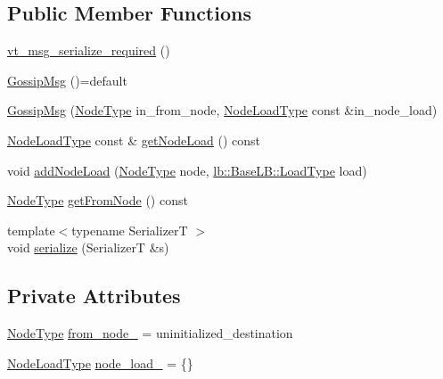 \subsection*{Public Member Functions}
\begin{DoxyCompactItemize}
\item 
\hyperlink{structvt_1_1vrt_1_1collection_1_1balance_1_1_gossip_msg_adf3c2f55e4349f8d5f497a0f88f047cf}{vt\+\_\+msg\+\_\+serialize\+\_\+required} ()
\item 
\hyperlink{structvt_1_1vrt_1_1collection_1_1balance_1_1_gossip_msg_ae5d9af18865ffcbf49139e587d6117b6}{Gossip\+Msg} ()=default
\item 
\hyperlink{structvt_1_1vrt_1_1collection_1_1balance_1_1_gossip_msg_a9ffebd54d8397a1e5efbd089524e53f2}{Gossip\+Msg} (\hyperlink{namespacevt_a866da9d0efc19c0a1ce79e9e492f47e2}{Node\+Type} in\+\_\+from\+\_\+node, \hyperlink{structvt_1_1vrt_1_1collection_1_1balance_1_1_gossip_msg_a8deef056cb137cfd67540a31be189122}{Node\+Load\+Type} const \&in\+\_\+node\+\_\+load)
\item 
\hyperlink{structvt_1_1vrt_1_1collection_1_1balance_1_1_gossip_msg_a8deef056cb137cfd67540a31be189122}{Node\+Load\+Type} const  \& \hyperlink{structvt_1_1vrt_1_1collection_1_1balance_1_1_gossip_msg_ad73dc00723416733adfc985a632d22e4}{get\+Node\+Load} () const
\item 
void \hyperlink{structvt_1_1vrt_1_1collection_1_1balance_1_1_gossip_msg_ad71cb026dce420d7c5e48d0fd87c2e61}{add\+Node\+Load} (\hyperlink{namespacevt_a866da9d0efc19c0a1ce79e9e492f47e2}{Node\+Type} node, \hyperlink{structvt_1_1vrt_1_1collection_1_1lb_1_1_base_l_b_a215e22b9f12678303f49615ae3be05cc}{lb\+::\+Base\+L\+B\+::\+Load\+Type} load)
\item 
\hyperlink{namespacevt_a866da9d0efc19c0a1ce79e9e492f47e2}{Node\+Type} \hyperlink{structvt_1_1vrt_1_1collection_1_1balance_1_1_gossip_msg_a025c5e1da0c0967bed68ba50666c92e5}{get\+From\+Node} () const
\item 
{\footnotesize template$<$typename SerializerT $>$ }\\void \hyperlink{structvt_1_1vrt_1_1collection_1_1balance_1_1_gossip_msg_a62aa6836c3898a1116fb20c0e03ba219}{serialize} (SerializerT \&s)
\end{DoxyCompactItemize}
\subsection*{Private Attributes}
\begin{DoxyCompactItemize}
\item 
\hyperlink{namespacevt_a866da9d0efc19c0a1ce79e9e492f47e2}{Node\+Type} \hyperlink{structvt_1_1vrt_1_1collection_1_1balance_1_1_gossip_msg_a8e53b7f4976cf2963e33c8c2c13bbf48}{from\+\_\+node\+\_\+} = uninitialized\+\_\+destination
\item 
\hyperlink{structvt_1_1vrt_1_1collection_1_1balance_1_1_gossip_msg_a8deef056cb137cfd67540a31be189122}{Node\+Load\+Type} \hyperlink{structvt_1_1vrt_1_1collection_1_1balance_1_1_gossip_msg_aca0029407939a6ee94fde942a009a8eb}{node\+\_\+load\+\_\+} = \{\}
\end{DoxyCompactItemize}
